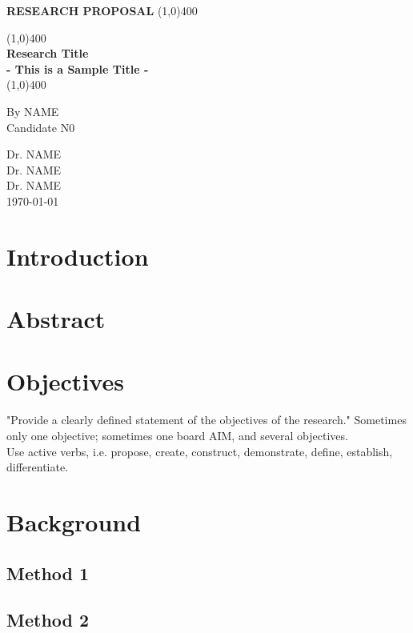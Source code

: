 \documentclass[12pt]{article}
\begin{document}
\begin{titlepage}
\begin{center}
\vspace{1cm}
\large{\textbf{RESEARCH PROPOSAL}}
\line(1,0){400}\\
\vfill

\line(1,0){400}\\[1mm]
\huge{\textbf{Research Title}}\\[1mm]
\large{\textbf{- This is a Sample Title -}}\\[1mm]
\line(1,0){400}\\[1mm]
\vfill

By NAME\\
Candidate N0\\
\vfill

Dr. NAME\\
Dr. NAME\\
Dr. NAME\\

\today\\
\end{center}
\end{titlepage}

\tableofcontents
\thispagestyle{empty}
\clearpage

\setcounter{page}{1}
\section{Introduction}

\section{Abstract}

\section{Objectives}
"Provide a clearly defined statement of the objectives of the research." Sometimes only one objective; sometimes one board AIM, and several objectives.\\
Use active verbs, i.e. propose, create, construct, demonstrate, define, establish, differentiate.
\section{Background}
\subsection{Method 1}
\subsection{Method 2}
\end{document}
